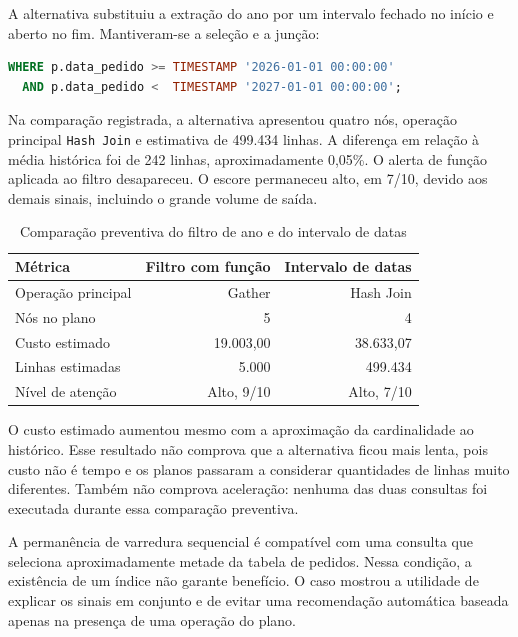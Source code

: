 \documentclass{UNESC}
\newcommand{\fonteautor}{\par\smallskip{\footnotesize Fonte: elaboração própria.}}
\begin{document}
A alternativa substituiu a extração do ano por um intervalo fechado no início e aberto no fim. Mantiveram-se a seleção e a junção:

\begin{lstlisting}[language=SQL]
WHERE p.data_pedido >= TIMESTAMP '2026-01-01 00:00:00'
  AND p.data_pedido <  TIMESTAMP '2027-01-01 00:00:00';
\end{lstlisting}

Na comparação registrada, a alternativa apresentou quatro nós, operação principal \texttt{Hash Join} e estimativa de 499.434 linhas. A diferença em relação à média histórica foi de 242 linhas, aproximadamente 0,05\%. O alerta de função aplicada ao filtro desapareceu. O escore permaneceu alto, em 7/10, devido aos demais sinais, incluindo o grande volume de saída.

\begin{table}[H]
\centering
\caption{Comparação preventiva do filtro de ano e do intervalo de datas}
\label{tab:datas}
\begin{singlespace}\small
\begin{tabularx}{\linewidth}{Y r r}
\toprule
\textbf{Métrica} & \textbf{Filtro com função} & \textbf{Intervalo de datas}\\
\midrule
Operação principal & Gather & Hash Join\\[0.4em]
Nós no plano & 5 & 4\\[0.4em]
Custo estimado & 19.003,00 & 38.633,07\\[0.4em]
Linhas estimadas & 5.000 & 499.434\\[0.4em]
Nível de atenção & Alto, 9/10 & Alto, 7/10\\
\bottomrule
\end{tabularx}
\fonteautor
\end{singlespace}
\end{table}

O custo estimado aumentou mesmo com a aproximação da cardinalidade ao histórico. Esse resultado não comprova que a alternativa ficou mais lenta, pois custo não é tempo e os planos passaram a considerar quantidades de linhas muito diferentes. Também não comprova aceleração: nenhuma das duas consultas foi executada durante essa comparação preventiva.

A permanência de varredura sequencial é compatível com uma consulta que seleciona aproximadamente metade da tabela de pedidos. Nessa condição, a existência de um índice não garante benefício. O caso mostrou a utilidade de explicar os sinais em conjunto e de evitar uma recomendação automática baseada apenas na presença de uma operação do plano.
\end{document}
